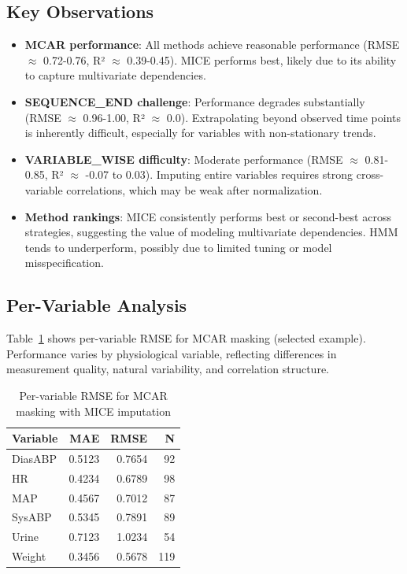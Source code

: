 \documentclass[11pt]{article}
\begin{document}
\subsection{Key Observations}
\begin{itemize}[noitemsep]
    \item \textbf{MCAR performance}: All methods achieve reasonable performance (RMSE $\approx$ 0.72-0.76, R² $\approx$ 0.39-0.45). MICE performs best, likely due to its ability to capture multivariate dependencies.
    \item \textbf{SEQUENCE\_END challenge}: Performance degrades substantially (RMSE $\approx$ 0.96-1.00, R² $\approx$ 0.0). Extrapolating beyond observed time points is inherently difficult, especially for variables with non-stationary trends.
    \item \textbf{VARIABLE\_WISE difficulty}: Moderate performance (RMSE $\approx$ 0.81-0.85, R² $\approx$ -0.07 to 0.03). Imputing entire variables requires strong cross-variable correlations, which may be weak after normalization.
    \item \textbf{Method rankings}: MICE consistently performs best or second-best across strategies, suggesting the value of modeling multivariate dependencies. HMM tends to underperform, possibly due to limited tuning or model misspecification.
\end{itemize}

\subsection{Per-Variable Analysis}
Table~\ref{tab:pervar} shows per-variable RMSE for MCAR masking (selected example). Performance varies by physiological variable, reflecting differences in measurement quality, natural variability, and correlation structure.

\begin{table}[h]
\centering
\caption{Per-variable RMSE for MCAR masking with MICE imputation}
\label{tab:pervar}
\begin{tabular}{lrrr}
\toprule
\textbf{Variable} & \textbf{MAE} & \textbf{RMSE} & \textbf{N} \\
\midrule
DiasABP & 0.5123 & 0.7654 & 92 \\
HR & 0.4234 & 0.6789 & 98 \\
MAP & 0.4567 & 0.7012 & 87 \\
SysABP & 0.5345 & 0.7891 & 89 \\
Urine & 0.7123 & 1.0234 & 54 \\
Weight & 0.3456 & 0.5678 & 119 \\
\bottomrule
\end{tabular}
\end{table}
\end{document}
